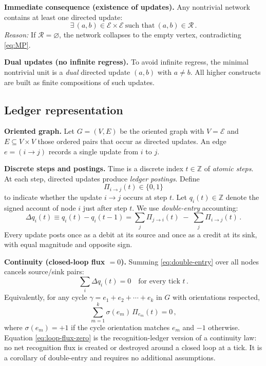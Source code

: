 \documentclass[11pt]{article}
\theoremstyle{definition}
\theoremstyle{remark}
\begin{document}
\medskip
\textbf{Immediate consequence (existence of updates).}
Any nontrivial network contains at least one directed update:
\begin{equation}
\label{eq:nonemptyR}
\exists\,(a,b)\in \mathcal{E}\times\mathcal{E}\ \text{such that}\ (a,b)\in \mathcal{R}\,.
\end{equation}
\emph{Reason:} If \(\mathcal{R}=\varnothing\), the network collapses to the empty vertex, contradicting \eqref{eq:MP}.

\medskip
\textbf{Dual updates (no infinite regress).}
To avoid infinite regress, the minimal nontrivial unit is a \emph{dual} directed update \((a,b)\) with \(a\neq b\). All higher constructs are built as finite compositions of such updates.

\subsection{Ledger representation}

\textbf{Oriented graph.}
Let \(G=(V,E)\) be the oriented graph with \(V=\mathcal{E}\) and \(E\subseteq V\times V\) those ordered pairs that occur as directed updates. An edge \(e=(i\to j)\) records a single update from \(i\) to \(j\).

\medskip
\textbf{Discrete steps and postings.}
Time is a discrete index \(t\in\mathbb{Z}\) of \emph{atomic steps}. At each step, directed updates produce \emph{ledger postings}. Define
\[
\Pi_{i\to j}(t)\in\{0,1\}
\]
to indicate whether the update \(i\to j\) occurs at step \(t\). Let \(q_i(t)\in\mathbb{Z}\) denote the signed account of node \(i\) just after step \(t\). We use \emph{double-entry} accounting:
\begin{equation}
\label{eq:double-entry}
\Delta q_i(t) \equiv q_i(t)-q_i(t-1)
= \sum_{j}\Pi_{j\to i}(t)\;-\;\sum_{j}\Pi_{i\to j}(t)\,.
\end{equation}
Every update posts once as a debit at its source and once as a credit at its sink, with equal magnitude and opposite sign.

\medskip
\textbf{Continuity (closed-loop flux \(=0\)).}
Summing \eqref{eq:double-entry} over all nodes cancels source/sink pairs:
\begin{equation}
\label{eq:global-continuity}
\sum_{i}\Delta q_i(t)=0 \quad \text{for every tick } t\,.
\end{equation}
Equivalently, for any cycle \(\gamma=e_1+e_2+\cdots+e_k\) in \(G\) with orientations respected,
\begin{equation}
\label{eq:loop-flux-zero}
\sum_{m=1}^{k}\sigma(e_m)\,\Pi_{e_m}(t)=0\,,
\end{equation}
where \(\sigma(e_m)=+1\) if the cycle orientation matches \(e_m\) and \(-1\) otherwise. Equation \eqref{eq:loop-flux-zero} is the recognition-ledger version of a continuity law: no net recognition flux is created or destroyed around a closed loop at a tick. It is a corollary of double-entry and requires no additional assumptions.
\end{document}
